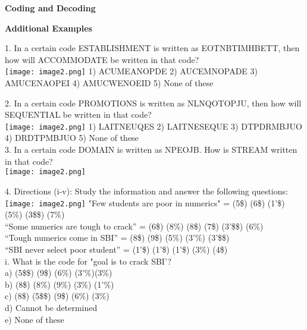 \documentclass[
]{article}
\author{}
\date{}
\begin{document}
	
 

\begin{center}
	{\Large \textbf{Coding and Decoding \\}}
\end{center}

{\large \textbf{Additional Examples  \\}}

1. In a certain code ESTABLISHMENT is written as EOTNBTIMHBETT, then how will
ACCOMMODATE be written in that code?\\
\texttt{[image: image2.png]}
1) ACUMEANOPDE \hspace{1mm}2) AUCEMNOPADE \hspace{1mm}3) AMUCENAOPEI
\hspace{1mm}4) AMUCWENOEID \hspace{1mm}5) None of these

2. In a certain code PROMOTIONS is written as NLNQOTOPJU, then how will SEQUENTIAL be written in that code?\\
\texttt{[image: image2.png]}
1) LAITNEUQES \hspace{1mm}2) LAITNESEQUE \hspace{1mm}3) DTPDRMBJUO \hspace{1mm}4) DRDTPMBJUO \hspace{1mm}5) None of these\\

3. In a certain code DOMAIN is written as NPEOJB. How is STREAM written in that code?\\
\texttt{[image: image2.png]}


4. Directions (i-v): Study the information and answer the following questions:\\
\texttt{[image: image2.png]}
"Few students are poor in numerics" = (5\$) (6\$) (1'\$) (5\%) (3\$\$) (7\%)\\
“Some numerics are tough to crack” = (6\$) (8\%) (8\$) (7\$) (3'\$\$) (6\%)\\
“Tough numerics come in SBI” = (8\$) (9\$) (5\%) (3'\%) (3'\$\$)\\
“SBI never select poor student” = (1'\$) (1'\$) (1'\$) (3\%) (4\$)\\
i. What is the code for "goal is to crack SBI'?\\
a) (5\$\$) (9\$) (6\%) (3'\%)(3\%)\\
b) (8\$) (8\%) (9\%) (3\%) (1'\%)\\
c) (8\$) (5\$\$) (9\$) (6\%) (3\%)\\
d) Cannot be determined\\
e) None of these\\
\end{document}
